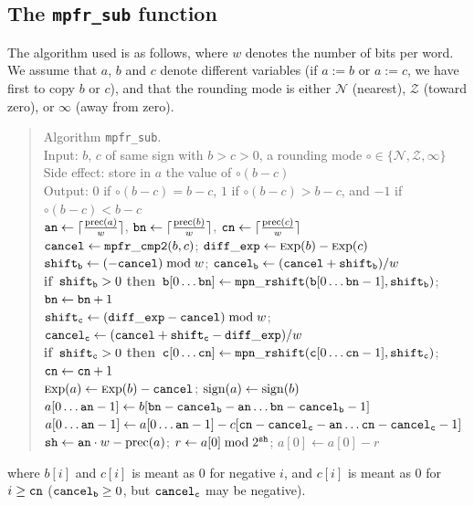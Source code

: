 \documentclass[12pt]{amsart}
\def\Exp{{\rm \textsc exp}}
\def\prec{{\rm prec}}
\def\sign{{\rm sign}}
\def\Z{{\mathcal Z}}
\def\N{{\mathcal N}}
\def\If{{\bf if}}
\def\then{{\bf then}}
\begin{document}
\subsection{The {\tt mpfr\_sub} function}

The algorithm used is as follows, where $w$ denotes the number of bits
per word. We assume that $a$, $b$ and $c$ denote different variables
(if $a:=b$ or $a:=c$, we have first to copy $b$ or $c$), and
that the rounding mode is either $\N$ (nearest),
$\Z$ (toward zero), or $\infty$ (away from zero).
\begin{quote}
Algorithm {\tt mpfr\_sub}. \\
Input: $b$, $c$ of same sign with $b > c > 0$, a rounding mode
$\circ \in \{ \N, \Z, \infty \}$ \\
Side effect: store in $a$ the value of $\circ(b - c)$ \\
Output: $0$ if $\circ(b - c) = b-c$, $1$ if $\circ(b - c) > b-c$,
        and $-1$ if $\circ(b - c) < b-c$ \\
${\tt an} \leftarrow \lceil \frac{\prec(a)}{w} \rceil$,
${\tt bn} \leftarrow \lceil \frac{\prec(b)}{w} \rceil$,
${\tt cn} \leftarrow \lceil \frac{\prec(c)}{w} \rceil$ \\
${\tt cancel} \leftarrow {\tt mpfr\_cmp2}(b, c)$; \quad
        ${\tt diff\_exp} \leftarrow \Exp(b)-\Exp(c)$ \\
${\tt shift_b} \leftarrow (-{\tt cancel}) \bmod w$; \quad
        ${\tt cancel_b} \leftarrow ({\tt cancel} + {\tt shift_b})/w$ \\
\If\ ${\tt shift_b} > 0$ \then\
        ${\tt b}[0 \dots \mbox{\tt bn}] \leftarrow
        {\tt mpn\_rshift}({\tt b}[0 \dots {\tt bn}-1], {\tt shift_b})$;
        ${\tt bn} \leftarrow {\tt bn} + 1$ \\
${\tt shift_c} \leftarrow ({\tt diff\_exp}-{\tt cancel}) \bmod w$; \quad
${\tt cancel_c} \leftarrow ({\tt cancel} + {\tt shift_c}-{\tt diff\_exp})/w$ \\
\If\ ${\tt shift_c} > 0$ \then\
        ${\tt c}[0 \dots \mbox{\tt cn}] \leftarrow
        {\tt mpn\_rshift}({\tt c}[0 \dots {\tt cn}-1], {\tt shift_c})$;
        ${\tt cn} \leftarrow {\tt cn} + 1$ \\
$\Exp(a) \leftarrow \Exp(b) - {\tt cancel}$; \quad
        $\sign(a) \leftarrow \sign(b)$ \\
$a[0 \dots {\tt an}-1] \leftarrow b[{\tt bn} - {\tt cancel_b} - {\tt an}
        \dots {\tt bn} - {\tt cancel_b} - 1]$ \\
$a[0 \dots {\tt an}-1] \leftarrow a[0 \dots {\tt an}-1] - c[{\tt cn} -
        {\tt cancel_c} - {\tt an} \dots {\tt cn} - {\tt cancel_c} - 1]$ \\
${\tt sh} \leftarrow {\tt an} \cdot w - \prec(a)$; \quad
        $r \leftarrow a[0] \bmod 2^{\tt sh}$; \quad
        $a[0] \leftarrow a[0] - r$ \\
\end{quote}
where $b[i]$ and $c[i]$ is meant as $0$ for negative $i$,
and $c[i]$ is meant as $0$ for $i \ge {\tt cn}$
(${\tt cancel_b} \ge 0$, but ${\tt cancel_c}$ may be negative).
\end{document}
